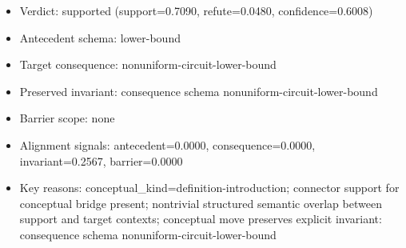 \documentclass[
]{article}
\newcounter{none} %
\providecommand{\tightlist}{%
  \setlength{\itemsep}{0pt}\setlength{\parskip}{0pt}}
\begin{document}
\begin{itemize}
\tightlist
\item
  Verdict: supported (support=0.7090, refute=0.0480, confidence=0.6008)
\item
  Antecedent schema: lower-bound
\item
  Target consequence: nonuniform-circuit-lower-bound
\item
  Preserved invariant: consequence schema nonuniform-circuit-lower-bound
\item
  Barrier scope: none
\item
  Alignment signals: antecedent=0.0000, consequence=0.0000,
  invariant=0.2567, barrier=0.0000
\item
  Key reasons: conceptual\_kind=definition-introduction; connector
  support for conceptual bridge present; nontrivial structured semantic
  overlap between support and target contexts; conceptual move preserves
  explicit invariant: consequence schema nonuniform-circuit-lower-bound
\end{itemize}
\end{document}

